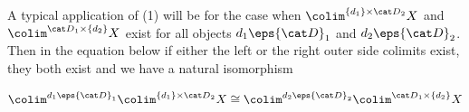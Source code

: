 \begin{rem}
\label{rem:grothendieckconstrcolims}
A typical application of  (1) will be for the case when $\colim^{\{d_1\} \times {\cat D}_2} X$ and $\colim^{{\cat D}_1 \times \{d_2\}} X$ exist for all objects $d_1 \eps {\cat D}_1$ and $d_2 \eps {\cat D}_2$. Then in the equation below if either the left or the right outer side colimits exist, they both exist and we have a natural isomorphism
\begin{center}
$\colim^{d_1 \eps {\cat D}_1} \colim^{\{d_1\} \times {\cat D}_2} X \cong \colim^{d_2 \eps {\cat D}_2} \colim^{{\cat D}_1 \times \{d_2\}} X$ 
\end{center}
\end{rem}

